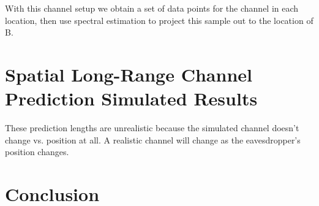 \documentclass[11pt]{article} %
\begin{document}
With this channel setup we obtain a set of data points for the channel in each location, then use spectral estimation to project this sample out to the location of B.




\section{Spatial Long-Range Channel Prediction Simulated Results}\label{simresults}



These prediction lengths are unrealistic because the simulated channel doesn't change vs. position at all.  A realistic channel will change as the eavesdropper's position changes. 

\section{Conclusion}

{}
\end{document}
